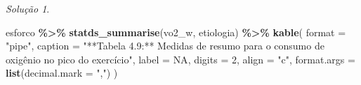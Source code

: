 \documentclass[
]{latex/krantz}
\newenvironment{Shaded}{\begin{snugshade}}{\end{snugshade}}
\newcommand{\AttributeTok}[1]{\textcolor[rgb]{0.13,0.29,0.53}{#1}}
\newcommand{\ConstantTok}[1]{\textcolor[rgb]{0.56,0.35,0.01}{#1}}
\newcommand{\DecValTok}[1]{\textcolor[rgb]{0.00,0.00,0.81}{#1}}
\newcommand{\FunctionTok}[1]{\textcolor[rgb]{0.13,0.29,0.53}{\textbf{#1}}}
\newcommand{\NormalTok}[1]{#1}
\newcommand{\SpecialCharTok}[1]{\textcolor[rgb]{0.81,0.36,0.00}{\textbf{#1}}}
\newcommand{\StringTok}[1]{\textcolor[rgb]{0.31,0.60,0.02}{#1}}
\theoremstyle{definition}
\theoremstyle{definition}
\theoremstyle{definition}
\theoremstyle{definition}
\theoremstyle{remark}
\newtheorem*{solution}{Solução}
\begin{document}
\begin{solution}
\begin{Shaded}
\begin{Highlighting}[]
\NormalTok{esforco }\SpecialCharTok{\%\textgreater{}\%}
  \FunctionTok{statds\_summarise}\NormalTok{(vo2\_w, etiologia) }\SpecialCharTok{\%\textgreater{}\%}
  \FunctionTok{kable}\NormalTok{(}
    \AttributeTok{format =} \StringTok{"pipe"}\NormalTok{,}
    \AttributeTok{caption =} \StringTok{"**Tabela 4.9:** Medidas de resumo para o consumo de oxigênio no pico do exercício"}\NormalTok{,}
    \AttributeTok{label =} \ConstantTok{NA}\NormalTok{,}
    \AttributeTok{digits =} \DecValTok{2}\NormalTok{,}
    \AttributeTok{align =} \StringTok{"c"}\NormalTok{,}
    \AttributeTok{format.args =} \FunctionTok{list}\NormalTok{(}\AttributeTok{decimal.mark =} \StringTok{","}\NormalTok{)}
\NormalTok{  )}
\end{Highlighting}
\end{Shaded}


\end{solution}
\end{document}
